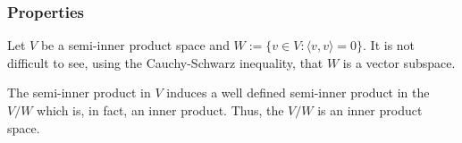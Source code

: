 \documentclass[12pt]{article}
\begin{document}
\subsubsection{Properties}

Let $V$ be a semi-inner product space and $W:=\{v \in V : \langle v , v \rangle = 0\}$. It is not difficult to see, using the Cauchy-Schwarz inequality, that $W$ is a vector subspace.

The semi-inner product in $V$ induces a well defined semi-inner product in the  $V/W$ which is, in fact, an inner product. Thus, the  $V/W$ is an inner product space.
\end{document}

